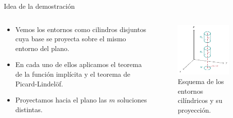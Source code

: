 \documentclass[10pt, spanish]{beamer}
\begin{document}
\begin{frame}{Idea de la demostración}

\begin{columns}[T]
\begin{column}{.48\textwidth}

\hspace{0pt}
\vspace{10mm}
\begin{itemize}
  \item Vemos los entornos como cilindros disjuntos cuya base se proyecta sobre el mismo entorno del plano.
  \item En cada uno de ellos aplicamos el teorema de la función implícita y el teorema de Picard-Lindelöf.
  \item Proyectamos hacia el plano las $m$ soluciones distintas.
\end{itemize}
\vfill
\hspace{0pt}
\end{column}%
\hfill%
\begin{column}{.48\textwidth}

\begin{figure}
	\centering
	\includegraphics[width=\textwidth]{../figures/cylinder.pdf}
	\caption{\footnotesize Esquema de los entornos cilíndricos y su proyección.}
\end{figure}
\end{column}%
\end{columns}
\end{frame}
\end{document}
